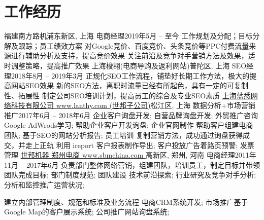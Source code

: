 \section{\textbf{工作经历}}
  \resumeSubHeadingListStart
    \resumeSubheading
      {福建南方路机}{浦东新区, 上海}
      {电商经理}{2019年5月 -- 至今}
      \resumeItemListStart
          {工作规划及分配；目标分解及跟踪；员工绩效方案}
          {对Google竞价、百度竞价、头条竞价等PPC付费流量来源进行辅助分析及支持，提高竞价效果}
          {关注前沿及竞争对手营销方法及效果，适时调整策略，提高推广效果}
      \resumeItemListEnd
    \resumeSubheading
      {上海梭翱(电商导购及返利网站)}{普陀区, 上海} %
      {SEO经理}{2018年8月 -- 2019年3月}
      \resumeItemListStart
          {正规化SEO工作流程，铺垫好长期工作方法，极大的提高网站SEO效果}
          {新的SEO方法，离职时流量已经有所起色，具有一定的可复制性、拓展性}
          {制定公司SEO培训计划，提高员工的综合及专业SEO素质}
      \resumeItemListEnd
    \resumeSubheading
      {\href{http://www.lanthy.com/}{上海蓝悉网络科技有限公司 www.lanthy.com (世邦子公司)}}{松江区, 上海}
      {数据分析+市场营销推广}{2017年6月 -- 2018年6月}
      \resumeItemListStart
          {企业客户询盘开发; 自营品牌询盘开发; 外贸推广咨询}
          {Google AdWrods学习; 帮助企业客户开发询盘; 企业官网制作}
          {帮助客户组建电商团队; 基于SEO的网站分析报告; 员工培训}
          {复制营销方法，成功通过询盘获得成交，并走上正轨}
          {利用 ireport 客户报表制作导出; 客户投放广告着路页预警; 发票管理}
      \resumeItemListEnd
    \resumeSubheading
      {\href{http://www.sbmchina.com/}{世邦机器 郑州电商 www.sbmchina.com }}{高新区, 郑州, 河南}
      {电商经理}{2011年11月 -- 2017年6月}
      \resumeItemListStart
          {负责部门整体网络营销，组建团队，培训员工，制定目标并带领团队完成目标; 部门制度规范; 团队建设}
          {技术前沿探索; 行业研究及竞争对手分析; 分析和监控推广运营状况;}

          {建立内部管理制度、规范和标准及业务流程}
          {电商CRM系统开发; 市场推广基于Google Map的客户展示系统; 公司推广网站询盘系统; }

